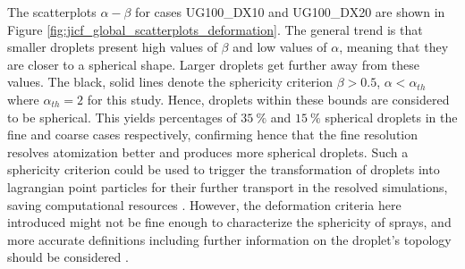 The scatterplots $\alpha - \beta$ for cases UG100\_DX10 and UG100\_DX20 are shown in Figure \ref{fig:jicf_global_scatterplots_deformation}.  The general trend is that smaller droplets present high values of $\beta$ and low values of $\alpha$, meaning that they are closer to a spherical shape. Larger droplets get further away from these values. The black, solid lines denote the sphericity criterion $\beta > 0.5$, $\alpha < \alpha_{th}$ where $\alpha_{th} = 2$ for this study. Hence, droplets within these bounds are considered to be spherical. This yields percentages of $35~\%$ and $15~\%$ spherical droplets in the fine and coarse cases respectively, confirming hence that the fine resolution resolves atomization better and produces more spherical droplets. Such a sphericity criterion could be used to trigger the transformation of droplets into lagrangian point particles for their further transport in the resolved simulations, saving computational resources . However, the deformation criteria here introduced might not be fine enough to characterize the sphericity of sprays, and more accurate definitions including further information on the droplet's topology should be considered . 



